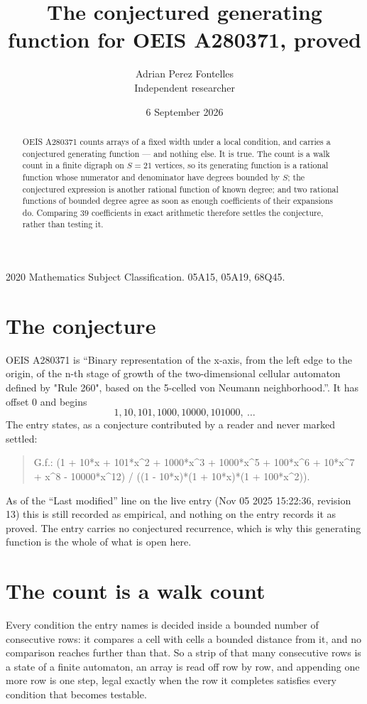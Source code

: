 \documentclass[11pt,a4paper]{article}
\title{The conjectured generating function for OEIS A280371, proved}
\author{Adrian Perez Fontelles\\ \small Independent researcher}
\date{6 September 2026}
\theoremstyle{plain}
\theoremstyle{definition}
\begin{document}
\maketitle

\begin{abstract}
OEIS A280371 counts arrays of a fixed width under a local condition, and carries a conjectured
generating function --- and nothing else. It is true. The count is a walk count in a finite
digraph on $S=21$ vertices, so its generating function is a rational function whose numerator
and denominator have degrees bounded by $S$; the conjectured expression is another rational
function of known degree; and two rational functions of bounded degree agree as soon as enough
coefficients of their expansions do. Comparing $39$ coefficients in exact arithmetic
therefore settles the conjecture, rather than testing it.
\end{abstract}

\noindent\small 2020 Mathematics Subject Classification. 05A15, 05A19, 68Q45.\normalsize

\section{The conjecture}

OEIS A280371 is ``Binary representation of the x-axis, from the left edge to the origin, of the n-th stage of growth of the two-dimensional cellular automaton defined by "Rule 260", based on the 5-celled von Neumann neighborhood.''. It has offset $0$ and begins
\[
1, 10, 101, 1000, 10000, 101000,\ \dots
\]
The entry states, as a conjecture contributed by a reader and never marked settled:
\begin{quote}
G.f.: (1 + 10*x + 101*x\^{}2 + 1000*x\^{}3 + 1000*x\^{}5 + 100*x\^{}6 + 10*x\^{}7 + x\^{}8 - 10000*x\^{}12) / ((1 - 10*x)*(1 + 10*x)*(1 + 100*x\^{}2)).
\end{quote}
As of the ``Last modified'' line on the live entry (Nov 05 2025 15:22:36, revision 13) this is still
recorded as empirical, and nothing on the entry records it as proved. The entry carries no
conjectured recurrence, which is why this generating function is the whole of what is open
here.

\section{The count is a walk count}

Every condition the entry names is decided inside a bounded number of consecutive rows: it
compares a cell with cells a bounded distance from it, and no comparison reaches further than
that. So a strip of that many consecutive rows is a state of a finite automaton, an array is
read off row by row, and appending one more row is one step, legal exactly when the row it
completes satisfies every condition that becomes testable.
\end{document}
